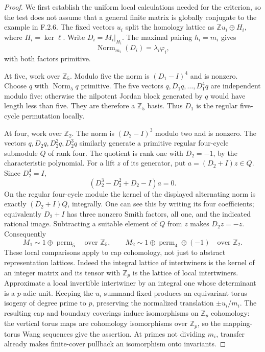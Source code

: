 \begin{proof}
We first establish the uniform local calculations needed
for the criterion, so the test does not assume that a
general finite matrix is globally conjugate to the example
in F.2.6.
The fixed vectors $u_i$ split the homology lattice as
$\mathbb Zu_i\oplus H_i$, where $H_i=\ker\ell$.
Write $D_i=M_i|_{H_i}$.
The maximal pairing $h_i=m_i$ gives
\[
 \operatorname{Norm}_{m_i}(D_i)=\lambda_i\varphi_i ,
 \tag{F.HC4}
\]
with both factors primitive.

At five, work over $\mathbb Z_5$.
Modulo five the norm is $(D_1-I)^4$ and is nonzero.
Choose $q$ with $\operatorname{Norm}_5q$ primitive.
The five vectors $q,D_1q,\ldots,D_1^4q$ are independent
modulo five: otherwise the nilpotent Jordan block generated
by $q$ would have length less than five.
They are therefore a $\mathbb Z_5$ basis.
Thus $D_1$ is the regular five-cycle permutation locally.

At four, work over $\mathbb Z_2$.
The norm is $(D_2-I)^3$ modulo two and is nonzero.
The vectors $q,D_2q,D_2^2q,D_2^3q$ similarly generate
a primitive regular four-cycle submodule $Q$ of rank four.
The quotient is rank one with $D_2=-1$, by the
characteristic polynomial.
For a lift $z$ of its generator, put $a=(D_2+I)z\in Q$.
Since $D_2^4=I$,
\[
 (D_2^3-D_2^2+D_2-I)a=0.
\]
On the regular four-cycle module the kernel of the
displayed alternating norm is exactly $(D_2+I)Q$,
integrally.  One can see this by writing its four
coefficients; equivalently $D_2+I$ has three nonzero
Smith factors, all one, and the indicated rational image.
Subtracting a suitable element of $Q$ from $z$ makes
$D_2z=-z$.
Consequently
\[
 M_1\sim 1\oplus\operatorname{perm}_5\quad\text{over }\mathbb Z_5,
 \qquad
 M_2\sim1\oplus\operatorname{perm}_4\oplus(-1)
 \quad\text{over }\mathbb Z_2 .
 \tag{F.HC5}
\]
These local comparisons apply to cap cohomology, not just
to abstract representation lattices.
Indeed the integral lattice of intertwiners is the kernel
of an integer matrix and its tensor with $\mathbb Z_p$
is the lattice of local intertwiners.
Approximate a local invertible intertwiner by an integral
one whose determinant is a $p$-adic unit.
Keeping the $u_i$ summand fixed produces an equivariant
torus isogeny of degree prime to $p$, preserving the
normalized translation $\pm u_i/m_i$.
The resulting cap and boundary coverings induce
isomorphisms on $\mathbb Z_p$ cohomology: the vertical
torus maps are cohomology isomorphisms over $\mathbb Z_p$,
so the mapping-torus Wang sequences give the assertion.
At primes not dividing $m_i$, transfer already makes
finite-cover pullback an isomorphism onto invariants.


\end{proof}
